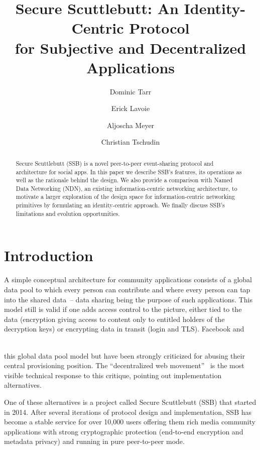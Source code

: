 \documentclass[9pt,sigconf]{acmart}
\title[Secure Scuttlebutt: An Identity-Centric Protocol
       for Subjective and Decentralized Applications]{%
  Secure Scuttlebutt: An Identity-Centric Protocol \\
  for Subjective and Decentralized Applications
}
\author{Dominic Tarr}
\affiliation{ssb:@EMovhfIrFk4NihAKnRNhrf}
\author{Erick Lavoie}
\affiliation{McGill University, Montreal, Canada}
\author{Aljoscha Meyer}
\affiliation{TU Berlin, Germany}
\author{Christian Tschudin}
\affiliation{University of Basel, Switzerland}
\begin{document}
\begin{abstract}
  Secure Scuttlebutt (SSB) is a novel peer-to-peer event-sharing
  protocol and architecture for social apps. In this paper we describe
  SSB's features, its operations as well as the rationale behind the
  design. We also provide a comparison with Named Data Networking
  (NDN), an existing information-centric networking architecture, to
  motivate a larger exploration of the design space for
  information-centric networking primitives by formulating an
  identity-centric approach. We finally discuss SSB's limitations and
  evolution opportunities.
\end{abstract}

\maketitle



\section{Introduction}

A simple conceptual architecture for community applications consists
of a global data pool to which every person can contribute and where
every person can tap into the shared data~-- data sharing being the
purpose of such applications. This model still is valid if one adds
access control to the picture, either tied to the data (encryption
giving access to content only to entitled holders of the decryption
keys) or encrypting data in transit (login and TLS). Facebook and
%
\\
\ 

\noindent
this global data pool model but have been strongly criticized for
abusing their central provisioning position.  The ``decentralized
web movement''~\cite{decent-2018-aug} is the most visible technical
response to this critique, pointing out implementation alternatives.

One of these alternatives is a project called Secure Scuttlebutt (SSB)
that started in 2014. After several iterations of protocol design and
implementation, SSB has become a stable service for over 10,000 users
offering them rich media community applications with strong
cryptographic protection (end-to-end encryption and metadata privacy)
and running in pure peer-to-peer mode.
\end{document}
